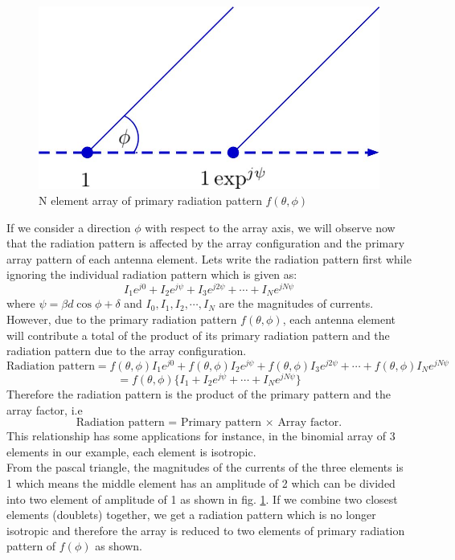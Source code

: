 \begin{figure}[h]
\centering
\includegraphics[width=1\linewidth]{"./graphics/img59_1"}
\caption{N element array of primary radiation pattern $f(\theta, \phi)$}
\label{fig:fig-2}
\end{figure}
If we consider a direction $\phi$ with respect to the array axis, we will observe now that the radiation pattern is affected by the array configuration and the primary array pattern of each antenna element. Lets write the radiation pattern first while ignoring the individual radiation pattern which is given as: 
$$I_1 e^{j0} + I_2 e^{j\psi} + I_3 e^{j2\psi} + \cdots + I_N e^{jN\psi}$$
where $\psi = \beta d\cos\phi + \delta$ and $I_0, I_1, I_2, \cdots, I_N$ are the magnitudes of currents. However, due to the primary radiation pattern $f(\theta, \phi)$, each antenna element will contribute a total of the product of its primary radiation pattern and the radiation pattern due to the array configuration.
\begin{dmath*}
\text{Radiation pattern} = f(\theta, \phi)I_1 e^{j0} + f(\theta, \phi)I_2 e^{j\psi} + f(\theta, \phi)I_3 e^{j2\psi} + \cdots + f(\theta, \phi)I_N e^{jN\psi} 
\end{dmath*}
$$= f(\theta, \phi)\{I_1 + I_2 e^{j\psi}  + \cdots + I_N e^{jN\psi}\}$$
Therefore the radiation pattern is the product of the primary pattern and the array factor, i.e
\begin{equation}
\text{Radiation pattern = Primary pattern $\times$ Array factor.}
\label{eqn53}
\end{equation}
This relationship has some applications for instance, in the binomial array of 3 elements in our example, each element is isotropic.\\
From the pascal triangle, the magnitudes of the currents of the three elements is 1   which means the middle element has an amplitude of 2 which can be divided into two element of amplitude of 1 as shown in fig. \ref{fig:fig-2}. If we combine two closest elements (doublets) together, we get a radiation pattern which is no longer isotropic and therefore the array is reduced to two elements of primary radiation pattern of $f(\phi)$ as shown.

